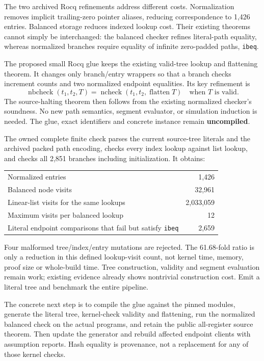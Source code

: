 \documentclass[11pt]{article}
\begin{document}
The two archived Rocq refinements address different costs. Normalization removes implicit trailing-zero pointer aliases, reducing correspondence to 1,426 entries. Balanced storage reduces indexed lookup cost. Their existing theorems cannot simply be interchanged: the balanced checker refines literal-path equality, whereas normalized branches require equality of infinite zero-padded paths, \texttt{ibeq}.

The proposed small Rocq glue keeps the existing valid-tree lookup and flattening theorem. It changes only branch/entry wrappers so that a branch checks increment counts and two normalized endpoint equalities. Its key refinement is
\[
 \operatorname{nbcheck}(t_1,t_2,T)
 =\operatorname{ncheck}(t_1,t_2,\operatorname{flatten}T)
 \quad\text{when }T\text{ is valid}.
\]
The source-halting theorem then follows from the existing normalized checker's soundness. No new path semantics, segment evaluator, or simulation induction is needed. The glue, exact identifiers and concrete instance remain \textbf{uncompiled}.

The owned complete finite check parses the current source-tree literals and the archived packed path encoding, checks every index lookup against list lookup, and checks all 2,851 branches including initialization. It obtains:
\begin{center}
\begin{tabular}{lr}
\toprule
Normalized entries & 1,426\\
Balanced node visits & 32,961\\
Linear-list visits for the same lookups & 2,033,059\\
Maximum visits per balanced lookup & 12\\
Literal endpoint comparisons that fail but satisfy \texttt{ibeq} & 2,659\\
\bottomrule
\end{tabular}
\end{center}
Four malformed tree/index/entry mutations are rejected. The 61.68-fold ratio is only a reduction in this defined lookup-visit count, not kernel time, memory, proof size or whole-build time. Tree construction, validity and segment evaluation remain work; existing evidence already shows nontrivial construction cost. Emit a literal tree and benchmark the entire pipeline.

The concrete next step is to compile the glue against the pinned modules, generate the literal tree, kernel-check validity and flattening, run the normalized balanced check on the actual programs, and retain the public all-register source theorem. Then update the generator and rebuild affected endpoint clients with assumption reports. Hash equality is provenance, not a replacement for any of those kernel checks.
\end{document}
